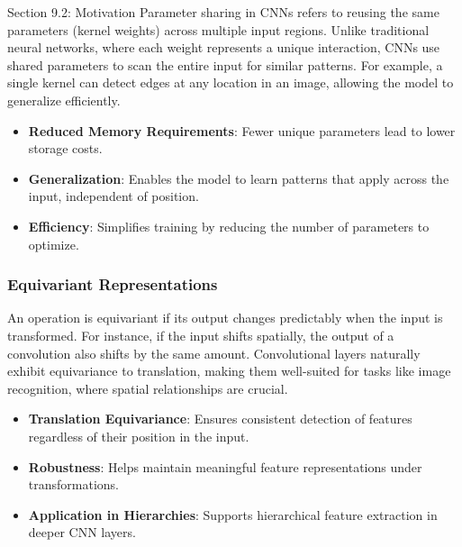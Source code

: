 \begin{notes}{Section 9.2: Motivation}
    Parameter sharing in CNNs refers to reusing the same parameters (kernel weights) across multiple input regions. Unlike traditional neural networks, where each weight represents a unique interaction, CNNs 
    use shared parameters to scan the entire input for similar patterns. For example, a single kernel can detect edges at any location in an image, allowing the model to generalize efficiently.
    
    \begin{highlight}
        \begin{itemize}
            \item \textbf{Reduced Memory Requirements}: Fewer unique parameters lead to lower storage costs.
            \item \textbf{Generalization}: Enables the model to learn patterns that apply across the input, independent of position.
            \item \textbf{Efficiency}: Simplifies training by reducing the number of parameters to optimize.
        \end{itemize}
    \end{highlight}
    
    \subsubsection*{Equivariant Representations}
    
    An operation is equivariant if its output changes predictably when the input is transformed. For instance, if the input shifts spatially, the output of a convolution also shifts by the same amount. 
    Convolutional layers naturally exhibit equivariance to translation, making them well-suited for tasks like image recognition, where spatial relationships are crucial.
    
    \begin{highlight}
        \begin{itemize}
            \item \textbf{Translation Equivariance}: Ensures consistent detection of features regardless of their position in the input.
            \item \textbf{Robustness}: Helps maintain meaningful feature representations under transformations.
            \item \textbf{Application in Hierarchies}: Supports hierarchical feature extraction in deeper CNN layers.
        \end{itemize}
    \end{highlight}
    

\end{notes}

